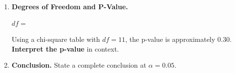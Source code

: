 \documentclass[10pt]{article}
\begin{document}
\begin{enumerate}[leftmargin=1.5em]
  \item \textbf{Degrees of Freedom and P-Value.}

        $df =$ \blank{3cm}

        \vspace{0.05in}
        Using a chi-square table with $df = 11$, the p-value is approximately 0.30.
        \textbf{Interpret the p-value} in context.


  \item \textbf{Conclusion.} State a complete conclusion at $\alpha = 0.05$.


\end{enumerate}
\end{document}
